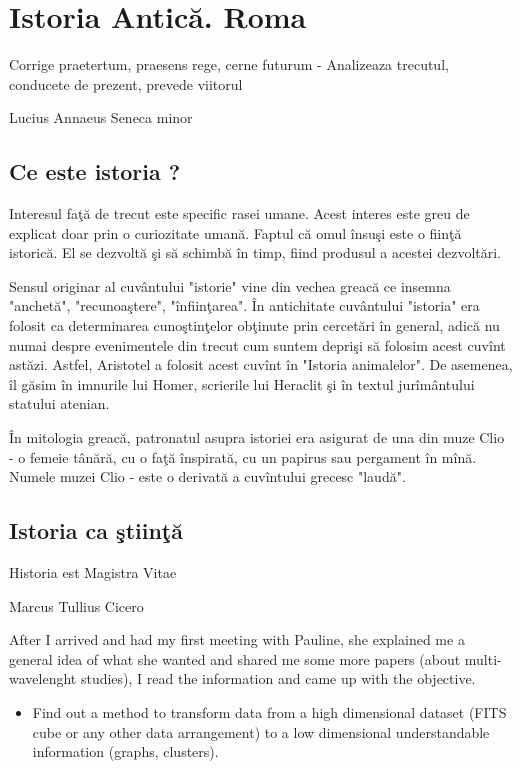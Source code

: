 
\chapter{Istoria Antică. Roma}
\epigraph{Corrige praetertum, praesens rege, cerne futurum - Analizeaza trecutul, conducete de prezent, prevede viitorul }{Lucius Annaeus Seneca minor}
\section{Ce este istoria ?}

Interesul faţă de trecut este specific rasei umane. Acest interes este greu de explicat doar prin o curiozitate umană. Faptul că omul însuşi  este o fiinţă istorică.  El se dezvoltă şi să schimbă în timp, fiind produsul a acestei dezvoltări.

Sensul originar al cuvântului "istorie" vine din vechea  greacă  ce insemna "anchetă", "recunoaştere", "înfiinţarea". În antichitate cuvântului "istoria" era folosit ca determinarea cunoştinţelor obţinute prin cercetări în general, adică nu numai despre evenimentele din trecut cum suntem deprişi să folosim acest cuvînt astăzi. Astfel, Aristotel a folosit acest cuvînt în "Istoria animalelor". De asemenea, îl găsim în imnurile lui Homer, scrierile lui Heraclit şi în textul jurîmântului statului atenian.



În mitologia greacă, patronatul asupra istoriei era asigurat de una din muze Clio - o femeie tânără, cu o faţă înspirată, cu un papirus sau pergament în mînă. Numele  muzei Clio - este o derivată  a cuvîntului  grecesc "laudă".



\section{Istoria ca ştiinţă}
\epigraph{Historia est Magistra Vitae}{Marcus Tullius Cicero}
After I arrived and had my first meeting with Pauline, she explained me a general idea of what she wanted and shared me some more papers (about multi-wavelenght studies), I read the information and came up with the objective.

\begin{itemize}
\item Find out a method to transform data from a high dimensional dataset (FITS cube or any other data arrangement) to a low dimensional understandable information (graphs, clusters).
\end{itemize}

